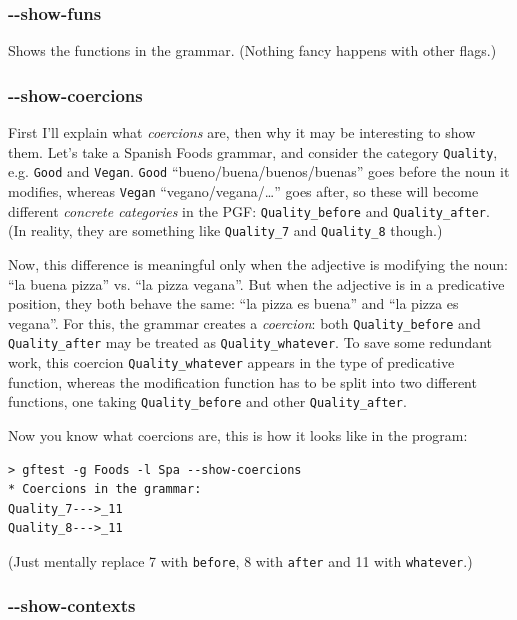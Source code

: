 \hypertarget{show-funs}{%
\subsubsection{-\/-show-funs}\label{show-funs}}

Shows the functions in the grammar. (Nothing fancy happens with other
flags.)

\hypertarget{show-coercions}{%
\subsubsection{-\/-show-coercions}\label{show-coercions}}

First I'll explain what \emph{coercions} are, then why it may be
interesting to show them. Let's take a Spanish Foods grammar, and
consider the category \texttt{Quality}, e.g. \texttt{Good} and
\texttt{Vegan}. \texttt{Good} ``bueno/buena/buenos/buenas'' goes before
the noun it modifies, whereas \texttt{Vegan} ``vegano/vegana/\ldots{}''
goes after, so these will become different \emph{concrete categories} in
the PGF: \texttt{Quality\_before} and \texttt{Quality\_after}. (In
reality, they are something like \texttt{Quality\_7} and
\texttt{Quality\_8} though.)

Now, this difference is meaningful only when the adjective is modifying
the noun: ``la buena pizza'' vs. ``la pizza vegana''. But when the
adjective is in a predicative position, they both behave the same: ``la
pizza es buena'' and ``la pizza es vegana''. For this, the grammar
creates a \emph{coercion}: both \texttt{Quality\_before} and
\texttt{Quality\_after} may be treated as \texttt{Quality\_whatever}. To
save some redundant work, this coercion \texttt{Quality\_whatever}
appears in the type of predicative function, whereas the modification
function has to be split into two different functions, one taking
\texttt{Quality\_before} and other \texttt{Quality\_after}.

Now you know what coercions are, this is how it looks like in the
program:

\begin{verbatim}
> gftest -g Foods -l Spa --show-coercions
* Coercions in the grammar:
Quality_7--->_11
Quality_8--->_11
\end{verbatim}

(Just mentally replace 7 with \texttt{before}, 8 with \texttt{after} and
11 with \texttt{whatever}.)

\hypertarget{show-contexts}{%
\subsubsection{-\/-show-contexts}\label{show-contexts}}

